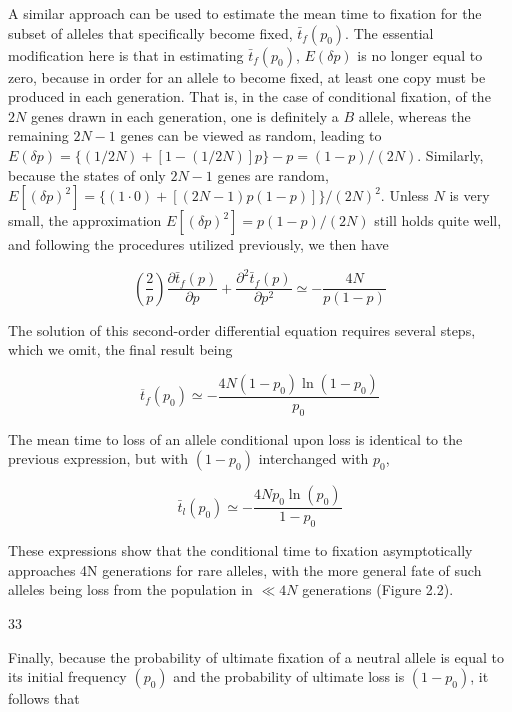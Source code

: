 \documentclass{article}
\begin{document}
A similar approach can be used to estimate the mean time to fixation for the subset of alleles that specifically become fixed,  $ \bar{t}_f(p_0) $. The essential modification here is that in estimating  $ \bar{t}_f(p_0) $,  $ E(\delta p) $ is no longer equal to zero, because in order for an allele to become fixed, at least one copy must be produced in each generation. That is, in the case of conditional fixation, of the  $ 2N $ genes drawn in each generation, one is definitely a  $ B $ allele, whereas the remaining  $ 2N - 1 $ genes can be viewed as random, leading to  $ E(\delta p) = \{(1/2N) + [1 - (1/2N)]p\} - p = (1 - p)/(2N) $. Similarly, because the states of only  $ 2N - 1 $ genes are random,  $ E[(\delta p)^2] = \{(1 \cdot 0) + [(2N - 1)p(1 - p)]\} / (2N)^2 $. Unless  $ N $ is very small, the approximation  $ E[(\delta p)^2] = p(1 - p)/(2N) $ still holds quite well, and following the procedures utilized previously, we then have

\begin{equation}
\left(\frac{2}{p}\right)\frac{\partial\bar{t}_{f}(p)}{\partial p}+\frac{\partial^{2}\bar{t}_{f}(p)}{\partial p^{2}}\simeq-\frac{4N}{p(1-p)}
\end{equation}

The solution of this second-order differential equation requires several steps, which we omit, the final result being

\begin{equation}
\overline{t}_{f}(p_{0})\simeq-\frac{4N(1-p_{0})\ln(1-p_{0})}{p_{0}}
\tag{2.11b}
\label{eq:2_11b}
\end{equation}

The mean time to loss of an allele conditional upon loss is identical to the previous expression, but with  $ (1 - p_0) $ interchanged with  $ p_0 $,

\begin{equation}
\bar{t}_{l}(p_{0})\simeq-\frac{4N p_{0}\ln(p_{0})}{1-p_{0}}
\tag{2.11c}
\label{eq:2_11c}
\end{equation}

These expressions show that the conditional time to fixation asymptotically approaches 4N generations for rare alleles, with the more general fate of such alleles being loss from the population in  $ \ll 4N $ generations (Figure 2.2).

33

Finally, because the probability of ultimate fixation of a neutral allele is equal to its initial frequency  $ (p_{0}) $ and the probability of ultimate loss is  $ (1 - p_{0}) $, it follows that
\end{document}
